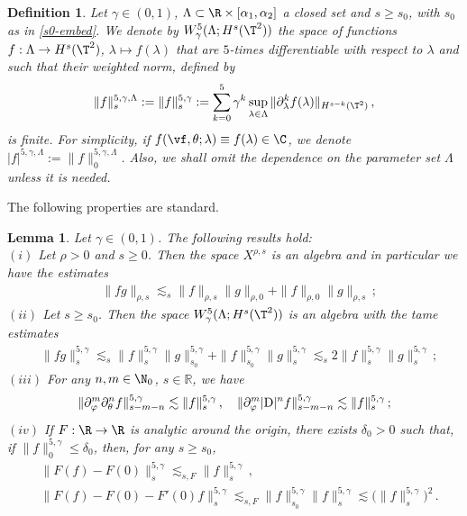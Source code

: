 \documentclass[a4paper,reqno,10pt]{article}
\newtheorem{defi}{Definition}[section]%
\newtheorem{lem}{Lemma}[section]
\newcommand{\pa}{\partial}
\begin{document}
\begin{defi}\label{W.space.def}
	Let $\gamma\in (0,1)$,  $\Lambda \subset \R\times [\alpha_{1},\alpha_{2}]$ a closed set and  $s\geq s_0$, with $s_0$ as in \eqref{s0-embed}. We denote by $W_\gamma^5(\Lambda; H^s(\T^2))$ the space of functions $f:\Lambda \to H^s(\T^2)$, $\lambda \mapsto f(\lambda)$ that are $5$-times differentiable with respect to $\lambda$ and such that their weighted norm, defined by
	\begin{equation}\label{norm.weighted.def}
        \| f\|_{s}^{5,\gamma,\Lambda} := \| f \|_{s}^{5,\gamma}  := \sum_{k=0}^{5} \gamma^{k} \sup_{\lambda\in\Lambda} \|  \pa_{\lambda}^k f(\lambda)\|_{H^{s-k}(\T^2)} \,,
	\end{equation}
	is finite. For simplicity, 
    if $f(\vf,\theta;\lambda) \equiv f(\lambda)\in \C$, we denote $|f|^{5,\gamma,\Lambda}:= \| f \|_{0}^{5,\gamma,\Lambda}$. Also, we shall omit the dependence on the parameter set $\Lambda$ unless it is needed.
\end{defi}

The following properties are standard.



\begin{lem}\label{lem-productlaw}
Let $\gamma \in (0,1)$. The following results hold:
\\[1mm]
\noindent $(i)$
    Let $\rho > 0$ and $s\geq 0$. Then the space  $ X^{\rho,s}$ is an algebra and in particular we have  the estimates
		\begin{align}
			&\| f g \|_{\rho,s}\lesssim_{s} \| f \|_{\rho,s}\| g \|_{\rho,0}+\| f \|_{\rho,0}\| g \|_{\rho,s} \,;
		\end{align}
\noindent $(ii)$
    Let $s\geq s_0$. Then the space  $ W_\gamma^5(\Lambda;H^s(\T^2))$ is an algebra with the tame estimates
		\begin{align}
			&\| f g \|_{s}^{5,\gamma} \lesssim_{s} \| f\|_{s}^{5,\gamma} \| g\|_{s_0}^{5,\gamma} +  \| f\|_{s_0}^{5,\gamma} \| g\|_{s}^{5,\gamma} \lesssim_{s} 2 \| f \|_{s}^{5,\gamma} \| g \|_{s}^{5,\gamma} \,;
		\end{align}
\noindent $(iii)$ For any $n,m\in \N_{0}$, $s\in\mathbb{R}$, we have
    $$
    \|\partial_\varphi^m\partial_\theta^n f\|_{s-m-n}^{5,\gamma}\lesssim \| f\|_{s}^{5,\gamma} \,, \quad \|\partial_\varphi^m |{\rm D}|^n f\|_{s-m-n}^{5,\gamma}\lesssim \| f\|_{s}^{5,\gamma} \,;
    $$
\noindent $(iv)$ If $F:\R\to\R$ is analytic around the origin, there exists $\delta_0>0$ such that, if  $\| f\|_{0}^{5,\gamma}\leq \delta_0 $, then, for any $s\geq s_0$,
    \begin{align}
    	 & \|F(f)-F(0)\|_{s}^{5,\gamma}\lesssim_{s,F} \| f\|_{s}^{5,\gamma} \,, \\
    	 &  \|F(f)-F(0) - F'(0)f\|_{s}^{5,\gamma}\lesssim_{s,F} \| f\|_{s_0}^{5,\gamma}\| f\|_{s}^{5,\gamma} \lesssim \big(\| f\|_{s}^{5,\gamma} \big)^2\,.
    \end{align}
\end{lem}
\end{document}
